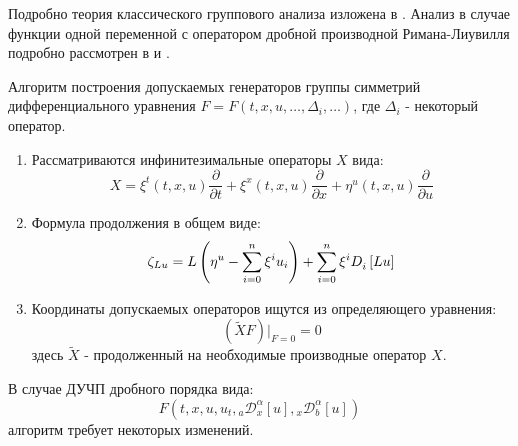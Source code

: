 \documentclass[a4paper, fontsize=14pt]{article}
\newcommand{\RLD}[3]{{}_{#1}\mathcal{D}_{#2}^{\alpha} \left[#3\right]} %
\newcommand{\D}[3]{D_{#1}^{#2} \left[ #3 \right]} %
\begin{document}
Подробно теория классического группового анализа изложена в \cite{ibragimov}.
Анализ в случае функции одной переменной с оператором дробной производной Римана-Лиувилля подробно рассмотрен в \cite{luka} и \cite{kasatkin-disert}.


Алгоритм построения допускаемых генераторов группы симметрий дифференциального уравнения $F = F(t, x, u, \dots,\varDelta_{i}, \dots)$, где $\varDelta_{i}$ - некоторый оператор.

\begin{enumerate}
  \item Рассматриваются инфинитезимальные операторы $X$ вида:
  \begin{equation*}
    X = \xi^t(t, x, u) \frac{\partial}{\partial t}  + \xi^x(t, x, u)  \frac{\partial}{\partial x}  + \eta^u(t, x, u)  \frac{\partial}{\partial u}
  \end{equation*}
  \item Формула продолжения в общем виде:
  \begin{equation}
    \label{eq:cont}
    \begin{split}
      {\huge \zeta}_{Lu} = L\left(\eta^u - \sum_{i=0}^{n} \xi^i u_i \right) + \sum_{i=0}^{n} \xi^i \D{i}{}{L u}
    \end{split}
  \end{equation}
  \item Координаты допускаемых операторов ищутся из определяющего уравнения:
  \begin{equation*}
    (\tilde{X}F)\bigg|_{F=0} = 0
  \end{equation*}
  здесь $\tilde{X}$ - продолженный на необходимые производные оператор $X$.
\end{enumerate}

В случае ДУЧП дробного порядка вида: $$ F(t, x, u, u_t, \RLD{a}{x}{u}, \RLD{x}{b}{u})$$ алгоритм требует некоторых изменений.
\end{document}
